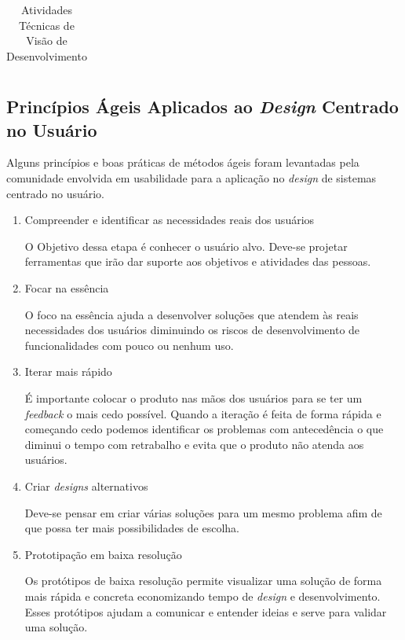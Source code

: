 \begin{itemize}
\begin{table}[h]
\begin{tabular}{|l|l|l|l|l|}
\end{tabular}
\caption{Atividades Técnicas de Visão de Desenvolvimento}
\end{table}

\end{itemize}

\newpage

\subsection{Princípios Ágeis Aplicados ao \emph{Design} Centrado no Usuário}

	Alguns princípios e boas práticas de métodos ágeis foram levantadas pela comunidade envolvida em usabilidade para a aplicação no \emph{design} de sistemas centrado no usuário.

\begin{enumerate}

\item Compreender e identificar as necessidades reais dos usuários

O Objetivo dessa etapa é conhecer o usuário alvo. Deve-se projetar ferramentas que irão dar suporte aos objetivos e atividades das pessoas.

\item Focar na essência

O foco na essência ajuda a desenvolver soluções que atendem às reais necessidades dos usuários diminuindo os riscos de desenvolvimento de funcionalidades com pouco ou nenhum uso.


\item Iterar mais rápido

	É importante colocar o produto nas mãos dos usuários para se ter um \textit{feedback} o mais cedo possível. Quando a iteração é feita de forma rápida e começando cedo podemos identificar os problemas com antecedência o que diminui o tempo com retrabalho e evita que o produto não atenda aos usuários.
	

\item Criar \emph{designs} alternativos

	Deve-se pensar em criar várias soluções para um mesmo problema afim de que possa ter mais possibilidades de escolha. 


\item Prototipação em baixa resolução

Os protótipos de baixa resolução permite visualizar uma solução de forma mais rápida e concreta economizando tempo de \emph{design} e desenvolvimento. Esses protótipos ajudam a comunicar e entender ideias e serve para validar uma solução. 


\end{enumerate}
